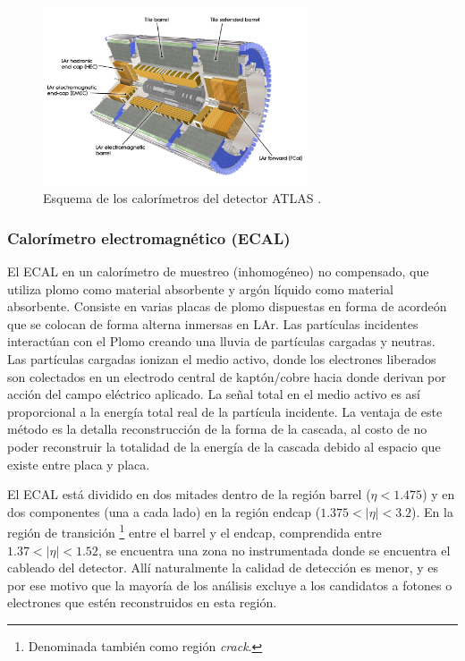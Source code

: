 \begin{figure}
\centering
  \includegraphics[width=0.7\textwidth]{images/lhc/calo_1.jpg}
  \caption{Esquema de los calorímetros del detector ATLAS \cite{Pequenao:1095927}.}
  \label{fig:calo_1}
\end{figure}

\subsubsection{Calorímetro electromagnético (ECAL)}

El ECAL en un calorímetro de muestreo (inhomogéneo) no compensado, que utiliza plomo como material absorbente y argón líquido como material absorbente. Consiste en varias placas de plomo dispuestas en forma de acordeón que se colocan de forma alterna inmersas en LAr. Las partículas incidentes interactúan con el Plomo creando una lluvia de partículas cargadas y neutras. Las partículas cargadas ionizan el medio activo, donde los electrones liberados son colectados en un electrodo central de kaptón/cobre hacia donde derivan por acción del campo eléctrico aplicado. La señal total en el medio activo es así proporcional a la energía total real de la partícula incidente. La ventaja de este método es la detalla reconstrucción de la forma de la cascada, al costo de no poder reconstruir la totalidad de la energía de la cascada debido al espacio que existe entre placa y placa.


El ECAL está dividido en dos mitades dentro de la región barrel ($\eta < 1.475$) y en dos componentes (una a cada lado) en la región endcap ($1.375 < |\eta| < 3.2$). 
En la región de transición \footnote{Denominada también como región \textit{crack}.} entre el barrel y el endcap, comprendida entre $1.37 < |\eta| < 1.52$, se encuentra una zona no instrumentada donde se encuentra el cableado del detector. 
Allí naturalmente la calidad de detección es menor, y es por ese motivo que la mayoría de los análisis excluye a los candidatos a fotones o electrones que estén reconstruidos en esta región.

